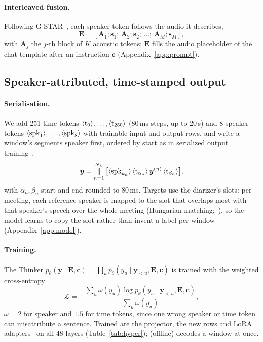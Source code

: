 \paragraph{Interleaved fusion.} Following G-STAR~\citep{peng2026gstar}, each speaker token follows the audio it describes,
\begin{equation}
\bm{E}=[\bm{A}_1;\bm{s}_1;\,\bm{A}_2;\bm{s}_2;\,\dots;\,\bm{A}_M;\bm{s}_M],
\label{eq:interleave}
\end{equation}
with $\bm{A}_j$ the $j$-th block of $K$ acoustic tokens; $\bm{E}$ fills the audio placeholder of the chat template after
an instruction $\bm{c}$ (Appendix~\ref{app:prompt}).

\subsection{Speaker-attributed, time-stamped output}
\label{sec:method-out}
\label{sec:method-train}

\paragraph{Serialisation.} We add 251 time tokens $\langle\mathrm{t}_{0}\rangle,\dots,\langle\mathrm{t}_{250}\rangle$ (80\,ms steps, up to 20\,s) and 8 speaker
tokens $\langle\mathrm{spk}_{1}\rangle,\dots,\langle\mathrm{spk}_{8}\rangle$ with trainable input and output rows, and write a window's segments speaker first,
ordered by start as in serialized output training~\citep{kanda2020sot},
\begin{equation}
\bm{y}=\mathop{\Vert}_{n=1}^{N_\mathcal{Y}}\big[\langle\mathrm{spk}_{k_n}\rangle\,\langle\mathrm{t}_{\alpha_n}\rangle\,\bm{y}^{(n)}\,\langle\mathrm{t}_{\beta_n}\rangle\big],
\label{eq:serial}
\end{equation}
with $\alpha_n,\beta_n$ start and end rounded to 80\,ms. Targets use the diarizer's slots: per meeting, each reference
speaker is mapped to the slot that overlaps most with that speaker's speech over the whole meeting (Hungarian
matching;~\citealp{kuhn1955hungarian}), so the model learns to copy the slot rather than invent a label per window
(Appendix~\ref{app:model}).

\paragraph{Training.} The Thinker $p_\theta(\bm{y}\mid\bm{E},\bm{c})=\prod_u p_\theta(y_u\mid\bm{y}_{<u},\bm{E},\bm{c})$ is trained with the weighted cross-entropy
\begin{equation}
\mathcal{L}=-\frac{\sum_{u}\omega(y_u)\log p_\theta(y_u\mid\bm{y}_{<u},\bm{E},\bm{c})}{\sum_{u}\omega(y_u)},
\label{eq:loss}
\end{equation}
$\omega=2$ for speaker and $1.5$ for time tokens, since one wrong speaker or time token can misattribute a sentence.
Trained are the projector, the new rows and LoRA adapters~\citep{hu2022lora} on all 48 layers (Table~\ref{tab:hyper});
\sys{} (offline) decodes a window at once.


